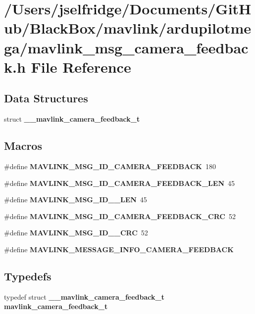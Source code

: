\section{/\+Users/jselfridge/\+Documents/\+Git\+Hub/\+Black\+Box/mavlink/ardupilotmega/mavlink\+\_\+msg\+\_\+camera\+\_\+feedback.h File Reference}
\label{mavlink__msg__camera__feedback_8h}
\subsection*{Data Structures}
\begin{DoxyCompactItemize}
\item 
struct \textbf{ \+\_\+\+\_\+mavlink\+\_\+camera\+\_\+feedback\+\_\+t}
\end{DoxyCompactItemize}
\subsection*{Macros}
\begin{DoxyCompactItemize}
\item 
\#define \textbf{ M\+A\+V\+L\+I\+N\+K\+\_\+\+M\+S\+G\+\_\+\+I\+D\+\_\+\+C\+A\+M\+E\+R\+A\+\_\+\+F\+E\+E\+D\+B\+A\+CK}~180
\item 
\#define \textbf{ M\+A\+V\+L\+I\+N\+K\+\_\+\+M\+S\+G\+\_\+\+I\+D\+\_\+\+C\+A\+M\+E\+R\+A\+\_\+\+F\+E\+E\+D\+B\+A\+C\+K\+\_\+\+L\+EN}~45
\item 
\#define \textbf{ M\+A\+V\+L\+I\+N\+K\+\_\+\+M\+S\+G\+\_\+\+I\+D\+\_\+\_\+\+L\+EN}~45
\item 
\#define \textbf{ M\+A\+V\+L\+I\+N\+K\+\_\+\+M\+S\+G\+\_\+\+I\+D\+\_\+\+C\+A\+M\+E\+R\+A\+\_\+\+F\+E\+E\+D\+B\+A\+C\+K\+\_\+\+C\+RC}~52
\item 
\#define \textbf{ M\+A\+V\+L\+I\+N\+K\+\_\+\+M\+S\+G\+\_\+\+I\+D\+\_\+\_\+\+C\+RC}~52
\item 
\#define \textbf{ M\+A\+V\+L\+I\+N\+K\+\_\+\+M\+E\+S\+S\+A\+G\+E\+\_\+\+I\+N\+F\+O\+\_\+\+C\+A\+M\+E\+R\+A\+\_\+\+F\+E\+E\+D\+B\+A\+CK}
\end{DoxyCompactItemize}
\subsection*{Typedefs}
\begin{DoxyCompactItemize}
\item 
typedef struct \textbf{ \+\_\+\+\_\+mavlink\+\_\+camera\+\_\+feedback\+\_\+t} \textbf{ mavlink\+\_\+camera\+\_\+feedback\+\_\+t}
\end{DoxyCompactItemize}


